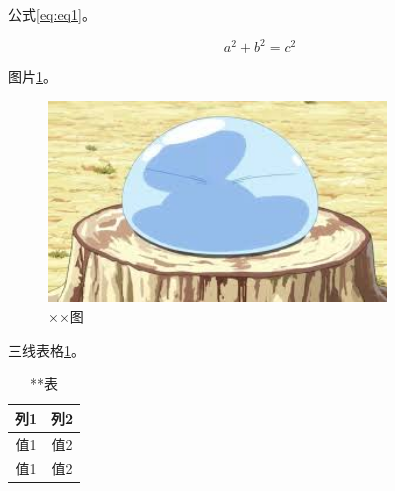 \documentclass{csuthesis}
\begin{document}
    公式\ref{eq:eq1}。

    \begin{equation}
        a^2 + b^2 = c^2 \label{eq:eq1}
    \end{equation}

    图片\ref{fig:image1}。
    \begin{figure}
        \centering
        \includegraphics[width=0.8\textwidth]{images/image.jpeg}
        \caption{××图}
        \label{fig:image1}
    \end{figure}

    三线表格\ref{tab:table1}。
    \begin{table}
        \centering
        \caption{**表}
        \label{tab:table1}
        \begin{tabular}{c c}
            \toprule[2pt]
            列1 & 列2 \\
            \midrule
            值1 & 值2 \\
            值1 & 值2 \\
            \bottomrule[2pt]
        \end{tabular}
    \end{table}
\end{document}

